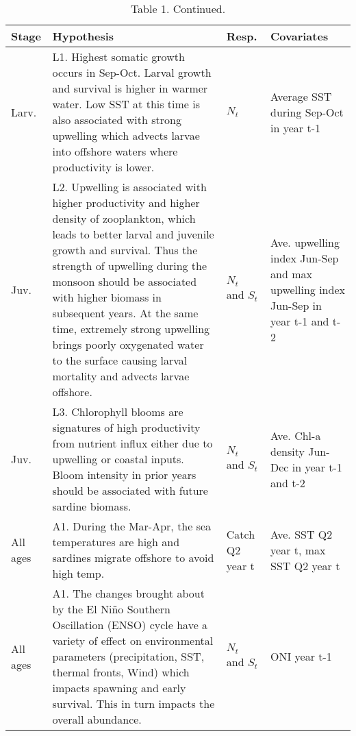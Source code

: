 \section{}\label{section}

\clearpage

\begin{table}[t]

\caption{\label{tab:unnamed-chunk-3}Table 1. Continued.}
\centering
\begin{tabular}{>{\raggedright\arraybackslash}p{1cm}|>{\raggedright\arraybackslash}p{8.5cm}|>{\raggedright\arraybackslash}p{1cm}|>{\raggedright\arraybackslash}p{3cm}}
\hline
Stage & Hypothesis & Resp. & Covariates\\
\hline
Larv. & L1.  Highest somatic growth occurs in Sep-Oct. Larval growth and survival is higher in warmer water. Low SST at this time is also associated with strong upwelling which advects larvae into offshore waters where productivity is lower. & $N_t$ & Average SST during Sep-Oct in year t-1\\
\hline
Juv. & L2. Upwelling is associated with higher productivity and higher density of zooplankton, which leads to better larval and juvenile growth and survival.  Thus the strength of upwelling during the monsoon should be associated with higher biomass in subsequent years. At the same time, extremely strong upwelling brings poorly oxygenated water to the surface causing larval mortality and advects larvae offshore. & $N_t$ and $S_t$ & Ave. upwelling index Jun-Sep and max upwelling index Jun-Sep in year t-1 and t-2\\
\hline
Juv. & L3. Chlorophyll blooms are signatures of high productivity from nutrient influx either due to upwelling or coastal inputs.  Bloom intensity in prior years should be associated with future sardine biomass. & $N_t$ and $S_t$ & Ave. Chl-a density Jun-Dec in year t-1 and t-2\\
\hline
All ages & A1. During the Mar-Apr, the sea temperatures are high and sardines migrate offshore to avoid high temp. & Catch Q2 year t & Ave. SST Q2 year t, max SST Q2 year t\\
\hline
All ages & A1. The changes brought about by the El Niño Southern Oscillation (ENSO) cycle have a variety of effect on environmental parameters (precipitation, SST, thermal fronts, Wind) which impacts spawning and early survival. This in turn impacts the overall abundance. & $N_t$ and $S_t$ & ONI year t-1\\
\hline
\end{tabular}
\end{table}
